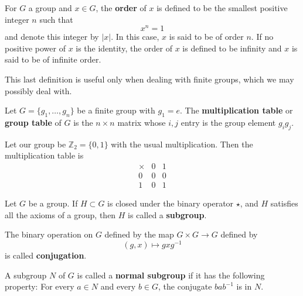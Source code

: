 \begin{defn}
For $G$ a group and $x\in G$, the \textbf{order} of $x$ is defined to be the
smallest positive integer $n$ such that 
\begin{equation}
x^n = 1
\end{equation}
and denote this integer by $|x|$. In this case, $x$ is said to be of order $n$.
If no positive power of $x$ is the identity, the order of $x$ is defined to be 
infinity and $x$ is said to be of infinite order.
\end{defn}

This last definition is useful only when dealing with finite groups, which we
may possibly deal with.

\begin{defn}
Let $G = \{g_1,\ldots,g_n\}$ be a finite group with $g_1=e$. The \textbf{multiplication table} or \textbf{group table} of $G$ is the $n\times n$ matrix
whose $i,j$ entry is the group element $g_ig_j$.
\end{defn}

\begin{ex}
Let our group be $\mathbb{Z}_2 = \{0,1\}$ with the usual multiplication. Then
the multiplication table is
\begin{equation}
\begin{array}{c|cc}
\times & 0 & 1 \\ \hline
0 & 0 & 0 \\
1 & 0 & 1 
\end{array}
\end{equation}
\end{ex}

\begin{defn}
Let $G$ be a group. If $H\subset G$ is closed under the binary operator $\star$,
and $H$ satisfies all the axioms of a group, then $H$ is called a \textbf{subgroup}.
\end{defn}

\begin{defn}
The binary operation on $G$ defined by the map $G\times G\to G$ defined by
\begin{equation}
(g,x)\mapsto gxg^{-1}
\end{equation}
is called \textbf{conjugation}.
\end{defn}

\begin{defn}
A subgroup $N$ of $G$ is called a \textbf{normal subgroup} if it has the
following property: For every $a\in N$ and every $b\in G$, the conjugate
$bab^{-1}$ is in $N$.
\end{defn}

